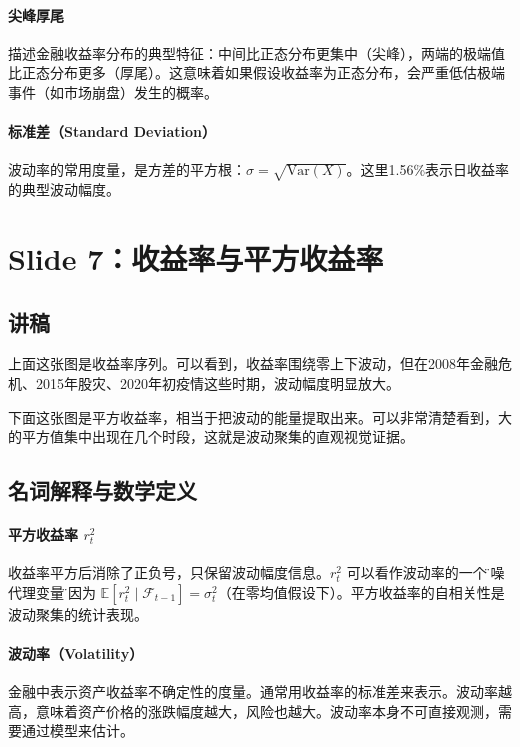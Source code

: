 \documentclass[11pt,a4paper]{article}
\begin{document}
\paragraph{尖峰厚尾} 描述金融收益率分布的典型特征：中间比正态分布更集中（尖峰），两端的极端值比正态分布更多（厚尾）。这意味着如果假设收益率为正态分布，会严重低估极端事件（如市场崩盘）发生的概率。

\paragraph{标准差（Standard Deviation）} 波动率的常用度量，是方差的平方根：\(\sigma = \sqrt{\text{Var}(X)}\)。这里1.56\%表示日收益率的典型波动幅度。

\newpage
\section*{Slide 7：收益率与平方收益率}

\subsection*{讲稿}
上面这张图是收益率序列。可以看到，收益率围绕零上下波动，但在2008年金融危机、2015年股灾、2020年初疫情这些时期，波动幅度明显放大。

下面这张图是平方收益率，相当于把波动的能量提取出来。可以非常清楚看到，大的平方值集中出现在几个时段，这就是波动聚集的直观视觉证据。

\subsection*{名词解释与数学定义}

\paragraph{平方收益率 \(r_t^2\)} 收益率平方后消除了正负号，只保留波动幅度信息。\(r_t^2\) 可以看作波动率的一个\"带噪代理变量\"，因为 \(\mathbb{E}[r_t^2 \mid \mathcal{F}_{t-1}] = \sigma_t^2\)（在零均值假设下）。平方收益率的自相关性是波动聚集的统计表现。

\paragraph{波动率（Volatility）} 金融中表示资产收益率不确定性的度量。通常用收益率的标准差来表示。波动率越高，意味着资产价格的涨跌幅度越大，风险也越大。波动率本身不可直接观测，需要通过模型来估计。
\end{document}
